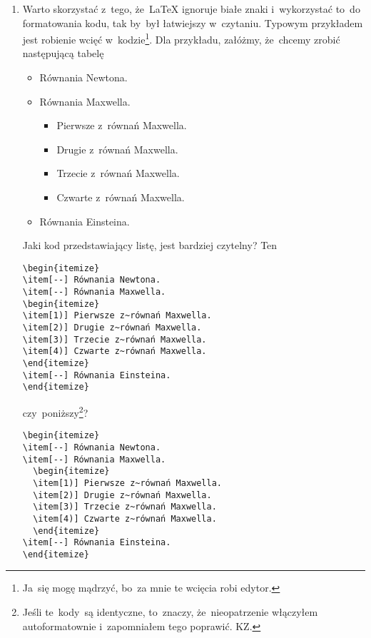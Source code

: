 \documentclass[a4paper,11pt]{article}
\begin{document}
\begin{enumerate}
\item Warto skorzystać z~tego, że~\LaTeX{} ignoruje białe znaki
  i~wykorzystać to~do formatowania kodu, tak by~był łatwiejszy
  w~czytaniu. Typowym przykładem jest robienie wcięć
  w~kodzie\footnote{Ja~się mogę mądrzyć, bo~za mnie te wcięcia robi
    edytor.}. Dla przykładu, załóżmy, że~chcemy zrobić następującą
  tabelę
  \begin{itemize}
  \item[--] Równania Newtona.
  \item[--] Równania Maxwella.
    \begin{itemize}
    \item[1)] Pierwsze z~równań Maxwella.
    \item[2)] Drugie z~równań Maxwella.
    \item[3)] Trzecie z~równań Maxwella.
    \item[4)] Czwarte z~równań Maxwella.
    \end{itemize}
  \item[--] Równania Einsteina.
  \end{itemize}
  Jaki kod przedstawiający listę, jest bardziej czytelny? Ten
\begin{verbatim}
\begin{itemize}
\item[--] Równania Newtona.
\item[--] Równania Maxwella.
\begin{itemize}
\item[1)] Pierwsze z~równań Maxwella.
\item[2)] Drugie z~równań Maxwella.
\item[3)] Trzecie z~równań Maxwella.
\item[4)] Czwarte z~równań Maxwella.
\end{itemize}
\item[--] Równania Einsteina.
\end{itemize}
\end{verbatim}
  czy~poniższy\footnote{Jeśli te~kody~są identyczne, to~znaczy,
    że~nieopatrzenie włączyłem autoformatownie i~zapomniałem tego
    poprawić. KZ.}?
\begin{verbatim}
\begin{itemize}
\item[--] Równania Newtona.
\item[--] Równania Maxwella.
  \begin{itemize}
  \item[1)] Pierwsze z~równań Maxwella.
  \item[2)] Drugie z~równań Maxwella.
  \item[3)] Trzecie z~równań Maxwella.
  \item[4)] Czwarte z~równań Maxwella.
  \end{itemize}
\item[--] Równania Einsteina.
\end{itemize}
\end{verbatim}
\end{enumerate}
\end{document}
